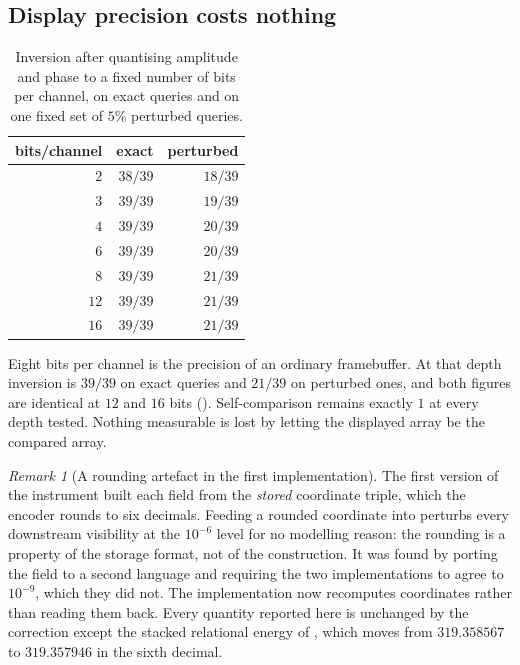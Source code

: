 \documentclass[11pt,twocolumn,a4paper]{article}
\theoremstyle{upthm}
\theoremstyle{definition}
\theoremstyle{remark}
\newtheorem{remark}[theorem]{Remark}
\begin{document}
\subsection{Display precision costs nothing}
\label{sec:display}

\begin{table}[htbp]
\centering\small
\caption{Inversion after quantising amplitude and phase to a fixed number
of bits per channel, on exact queries and on one fixed set of $5\%$
perturbed queries.}
\label{tab:display}
\begin{tabular}{@{}rrr@{}}
\toprule
bits/channel & exact & perturbed\\
\midrule
$2$  & $38/39$ & $18/39$\\
$3$  & $39/39$ & $19/39$\\
$4$  & $39/39$ & $20/39$\\
$6$  & $39/39$ & $20/39$\\
$8$  & $39/39$ & $21/39$\\
$12$ & $39/39$ & $21/39$\\
$16$ & $39/39$ & $21/39$\\
\bottomrule
\end{tabular}
\end{table}

Eight bits per channel is the precision of an ordinary framebuffer. At
that depth inversion is $39/39$ on exact queries and $21/39$ on perturbed
ones, and both figures are identical at $12$ and $16$ bits
(). Self-comparison remains exactly $1$ at every depth
tested. Nothing measurable is lost by letting the displayed array be the
compared array.

\begin{remark}[A rounding artefact in the first implementation]
\label{rem:rounding}
The first version of the instrument built each field from the
\emph{stored} coordinate triple, which the encoder rounds to six
decimals. Feeding a rounded coordinate into  perturbs
every downstream visibility at the $10^{-6}$ level for no modelling
reason: the rounding is a property of the storage format, not of the
construction. It was found by porting the field to a second language
and requiring the two implementations to agree to $10^{-9}$, which they
did not. The implementation now recomputes coordinates rather than
reading them back. Every quantity reported here is unchanged by the
correction except the stacked relational energy of ,
which moves from $319.358567$ to $319.357946$ in the sixth decimal.
\end{remark}
\end{document}
